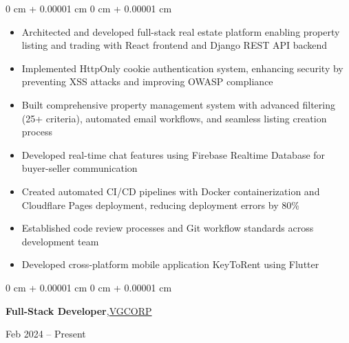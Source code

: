 \documentclass[10pt, letterpaper]{article}
\newenvironment{highlights}{
    \begin{itemize}[
        topsep=0.10 cm,
        parsep=0.10 cm,
        partopsep=0pt,
        itemsep=0pt,
        leftmargin=0 cm + 10pt
    ]
}{
    \end{itemize}
} %
\newenvironment{onecolentry}{
    \begin{adjustwidth}{
        0 cm + 0.00001 cm
    }{
        0 cm + 0.00001 cm
    }
}{
    \end{adjustwidth}
} %
\newenvironment{twocolentry}[2][]{
    \onecolentry
    \def\secondColumn{#2}
    \setcolumnwidth{\fill, 4.5 cm}
    \begin{paracol}{2}
}{
    \switchcolumn \raggedleft \secondColumn
    \end{paracol}
    \endonecolentry
} %
\begin{document}
        \vspace{0.15 cm}
        \begin{onecolentry}
            \begin{highlights}
                \item Architected and developed full-stack real estate platform enabling property listing and trading with React frontend and Django REST API backend
                \item Implemented HttpOnly cookie authentication system, enhancing security by preventing XSS attacks and improving OWASP compliance
                \item Built comprehensive property management system with advanced filtering (25+ criteria), automated email workflows, and seamless listing creation process
                \item Developed real-time chat features using Firebase Realtime Database for buyer-seller communication
                \item Created automated CI/CD pipelines with Docker containerization and Cloudflare Pages deployment, reducing deployment errors by 80\%
                \item Established code review processes and Git workflow standards across development team
                \item Developed cross-platform mobile application KeyToRent using Flutter
            \end{highlights}
        \end{onecolentry}

        \vspace{0.2 cm}

        \begin{twocolentry}{
            Feb 2024 – Present
        }   
            \textbf{Full-Stack Developer},\href{https://www.vgcorp.vn}{VGCORP}
        \end{twocolentry}
\end{document}
